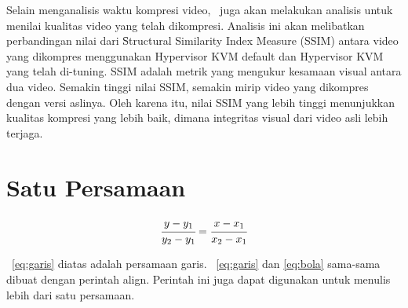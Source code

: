Selain menganalisis waktu kompresi video, \saya\ juga akan melakukan analisis untuk menilai kualitas video yang telah dikompresi. Analisis ini akan melibatkan perbandingan nilai dari \f{Structural Similarity Index Measure} (SSIM) antara video yang dikompres menggunakan Hypervisor KVM default dan Hypervisor KVM yang telah di-tuning. SSIM adalah metrik yang mengukur kesamaan visual antara dua video. Semakin tinggi nilai SSIM, semakin mirip video yang dikompres dengan versi aslinya. Oleh karena itu, nilai SSIM yang lebih tinggi menunjukkan kualitas kompresi yang lebih baik, dimana integritas visual dari video asli lebih terjaga.

\iffalse
\section{Satu Persamaan}

\noindent \begin{align}\label{eq:garis}
    \cfrac{y - y_{1}}{y_{2} - y_{1}} = 
    \cfrac{x - x_{1}}{x_{2} - x_{1}}
\end{align}

\equ~\ref{eq:garis} diatas adalah persamaan garis. 
\equ~\ref{eq:garis} dan \ref{eq:bola} sama-sama dibuat dengan perintah \bslash
align. 
Perintah ini juga dapat digunakan untuk menulis lebih dari satu persamaan. 

